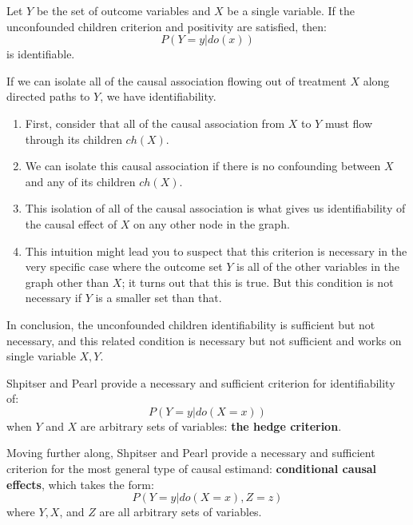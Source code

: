 \begin{definition}
    Let $Y$ be the set of outcome variables and $X$ be a single variable. If the unconfounded children criterion and positivity are satisfied, then:
    \begin{equation}
        P(Y = y |do(x))
    \end{equation}
    is identifiable.
\end{definition}

If we can isolate all of the causal association flowing out of treatment $X$ along directed paths to $Y$, we have identifiability.
\begin{enumerate}
    \item First, consider that all of the causal association from $X$ to $Y$ must flow through its children $ch(X)$.
    \item We can isolate this causal association if there is no confounding between $X$ and any of its children $ch(X)$.

    \item This isolation of all of the causal association is what gives us identifiability of the causal effect of $X$ on any other node in the graph.
    \item This intuition might lead you to suspect that this criterion is necessary in the very specific case where the outcome set $Y$ is all of the other variables in the graph other than $X$; it turns out that this is true. But this condition is not necessary if $Y$ is a smaller set than that.
\end{enumerate}

In conclusion, the unconfounded children identifiability is sufficient but not necessary, and
this related condition is necessary but not sufficient and works on single variable $X, Y$.

Shpitser and Pearl provide a necessary and sufficient criterion for identifiability of:
\begin{equation}
    P(Y = y|do(X = x))
\end{equation}
when $Y$ and $X$ are arbitrary sets of variables: \textbf{the hedge criterion}.

Moving further along, Shpitser and Pearl provide a necessary and sufficient criterion for the most general type of causal estimand: \textbf{conditional causal effects}, which takes the form:
\begin{equation}
    P(Y = y|do(X=x), Z = z)
\end{equation}
where $Y, X$, and $Z$ are all arbitrary sets of variables.